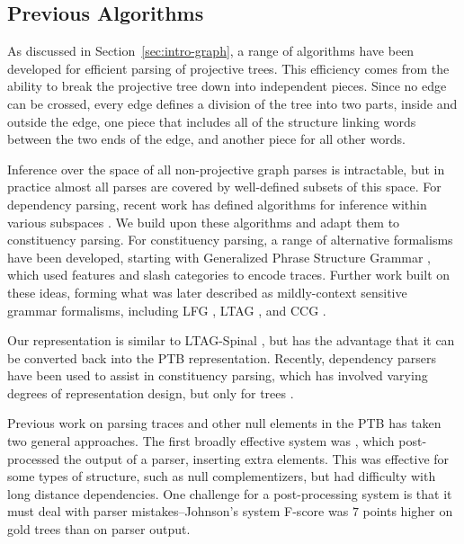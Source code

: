 \subsection{Previous Algorithms}

As discussed in Section~\ref{sec:intro-graph}, a range of algorithms have been developed for efficient parsing of projective trees.
This efficiency comes from the ability to break the projective tree down into independent pieces.
Since no edge can be crossed, every edge defines a division of the tree into two parts, inside and outside the edge, \myie one piece that includes all of the structure linking words between the two ends of the edge, and another piece for all other words.

Inference over the space of all non-projective graph parses is intractable, but in practice almost all parses are covered by well-defined subsets of this space.
For dependency parsing, recent work has defined algorithms for inference within various subspaces \parencite{Gomez-Rodriguez:2010,ec}.
We build upon these algorithms and adapt them to constituency parsing.
For constituency parsing, a range of alternative formalisms have been developed, starting with Generalized Phrase Structure Grammar \parencite{gpsg}, which used features and slash categories to encode traces.
Further work built on these ideas, forming what was later described as mildly-context sensitive grammar formalisms, including LFG \parencite{Bresnan:1982}, LTAG \parencite{Joshi:1997}, and CCG \parencite{Steedman:2000}.

Our representation is similar to LTAG-Spinal \parencite{Shen:2007}, but has the advantage that it can be converted back into the PTB representation.
Recently, dependency parsers have been used to assist in constituency parsing, which has involved varying degrees of representation design, but only for trees \parencite{hall2007hybrid,hall-nivre:2008:PaGe,kong-rush-smith:2015:NAACL-HLT,fernandezgonzalez-martins:2015:ACL-IJCNLP}.

Previous work on parsing traces and other null elements in the PTB has taken two general approaches.
The first broadly effective system was \textcite{Johnson:2002}, which post-processed the output of a parser, inserting extra elements.
This was effective for some types of structure, such as null complementizers, but had difficulty with long distance dependencies.
One challenge for a post-processing system is that it must deal with parser mistakes--Johnson's system F-score was $7$ points higher on gold trees than on parser output.

